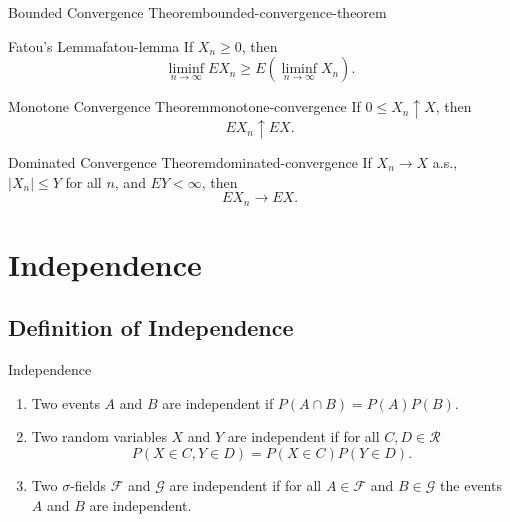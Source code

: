 \begin{theorem}{Bounded Convergence Theorem}{bounded-convergence-theorem}

\end{theorem}

\begin{theorem}{Fatou's Lemma}{fatou-lemma}
    If $X_n \geq 0$, then
    \begin{equation}
        \liminf _{n \rightarrow \infty} E X_{n} \geq E\left(\liminf _{n \rightarrow \infty} X_{n}\right).
    \end{equation}
\end{theorem}


\begin{theorem}{Monotone Convergence Theorem}{monotone-convergence}
    If $0 \leq X_{n} \uparrow X$, then
    \begin{equation}
        E X_{n} \uparrow E X.
    \end{equation}
\end{theorem}

\begin{theorem}{Dominated Convergence Theorem}{dominated-convergence}
    If $X_{n} \rightarrow X$ a.s., $\left|X_{n}\right| \leq Y$ for all $n$, and $E Y<\infty$, then
    \begin{equation}
        E X_{n} \rightarrow E X.
    \end{equation}
\end{theorem}

\section{Independence}

\subsection{Definition of Independence}

\begin{definition}{Independence}{}
    \begin{enumerate}
        \item Two events $A$ and $B$ are independent if $P(A \cap B)=P(A) P(B)$.
        \item Two random variables $X$ and $Y$ are independent if for all $C,D\in\mathcal{R}$
              \begin{equation}
                  P(X\in C,Y\in D)=P(X\in C)P(Y\in D).
              \end{equation}
        \item Two $\sigma$-fields $\mathcal{F}$ and $\mathcal{G}$ are independent if for all $A\in\mathcal{F}$ and $B\in\mathcal{G}$ the events $A$ and $B$ are independent.
    \end{enumerate}
\end{definition}

